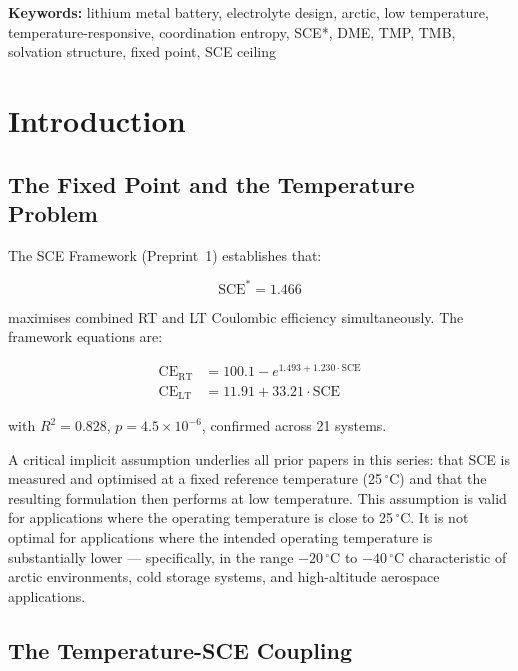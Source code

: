 \documentclass[11pt]{article}
\theoremstyle{plain}
\theoremstyle{definition}
\theoremstyle{remark}
\begin{document}
\vspace{1em}
\noindent\textbf{Keywords:} lithium metal battery, electrolyte
design, arctic, low temperature, temperature-responsive,
coordination entropy, SCE*, DME, TMP, TMB, solvation structure,
fixed point, SCE ceiling

\tableofcontents
\newpage

\section{Introduction}

\subsection{The Fixed Point and the Temperature Problem}

The SCE Framework (Preprint~1) establishes that:

\begin{equation}
  \mathrm{SCE}^{*} = 1.466
  \label{eq:fixed_point}
\end{equation}

maximises combined RT and LT Coulombic efficiency simultaneously.
The framework equations are:

\begin{align}
  \mathrm{CE}_{\mathrm{RT}} &= 100.1 - e^{1.493 + 1.230 \cdot \mathrm{SCE}}
  \label{eq:CE_RT}\\[4pt]
  \mathrm{CE}_{\mathrm{LT}} &= 11.91 + 33.21 \cdot \mathrm{SCE}
  \label{eq:CE_LT}
\end{align}

with $R^2 = 0.828$, $p = 4.5 \times 10^{-6}$, confirmed across 21
systems.

A critical implicit assumption underlies all prior papers in this
series: that SCE is measured and optimised at a fixed reference
temperature (25\,$^\circ$C) and that the resulting formulation then
performs at low temperature.  This assumption is valid for
applications where the operating temperature is close to 25\,$^\circ$C.
It is not optimal for applications where the intended operating
temperature is substantially lower --- specifically, in the range
$-20\,^\circ$C to $-40\,^\circ$C characteristic of arctic environments,
cold storage systems, and high-altitude aerospace applications.

\subsection{The Temperature-SCE Coupling}
\end{document}
